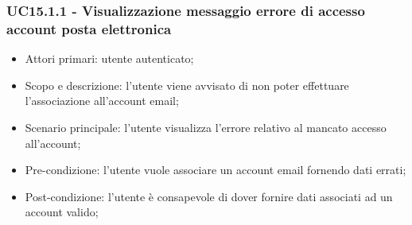 \subsubsection{UC15.1.1 - Visualizzazione messaggio errore di accesso account posta elettronica}
\begin{itemize}
	\item  Attori primari: utente autenticato;
	\item  Scopo e descrizione: l'utente viene avvisato di non poter effettuare l'associazione all'account email;
	\item  Scenario principale: l'utente visualizza l'errore relativo al mancato accesso all'account;
	\item  Pre-condizione: l'utente vuole associare un account email fornendo dati errati;
	\item  Post-condizione: l'utente è consapevole di dover fornire dati associati ad un account valido;
\end{itemize}
